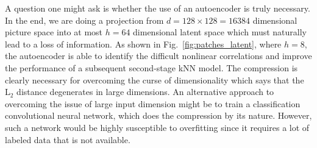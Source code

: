 A question one might ask is whether the use of an autoencoder is truly necessary. In the end, we are doing a projection from $d=128\times128=16384$ dimensional picture space into at most $h=64$ dimensional latent space which must naturally lead to a loss of information. As shown in Fig.~\ref{fig:patches_latent}, where $h=8$, the autoencoder is able to identify the difficult nonlinear correlations and improve the performance of a subsequent second-stage kNN model. The compression is clearly necessary for overcoming the curse of dimensionality which says that the L$_2$ distance degenerates in large dimensions. An alternative approach to overcoming the issue of large input dimension might be to train a classification convolutional neural network, which does the compression by its nature. However, such a network would be highly susceptible to overfitting since it requires a lot of labeled data that is not available.

